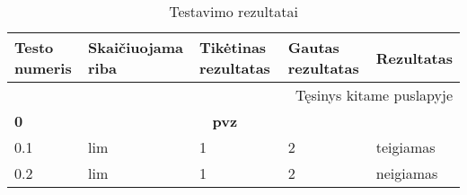 \begin{center}
    \newcommand*\rot{\rotatebox{90}}
    \newcommand{\x}{$\times$}
    \newcommand{\green}{\cellcolor{green!50} teigiamas}
    \newcommand{\red}{\cellcolor{red!50} neigiamas}
    \newcommand{\noLimit}{Riba neegzistuoja}
    \newcommand{\header}[2]{\textbf{#1} & \multicolumn{3}{c}{\textbf{#2}} & \\ \hline}
    \begin{longtable}{|m{}|m{}|m{}|m{}|m{}|}
    \caption{Testavimo rezultatai} \label{tab:rez} \\
    \hline
        \textbf{Testo numeris} & \textbf{Skaičiuojama riba} &\textbf{Tikėtinas rezultatas} & \textbf{Gautas rezultatas} & \textbf{Rezultatas} \\ \hline
    \endhead
        \multicolumn{5}{|r|}{{Tęsinys kitame puslapyje}} \\ \hline
    \endfoot
    \hline \hline
    \endlastfoot
    \header{0}{pvz}
    0.1 & lim & 1 & 2  & \green \\ \hline
    0.2 & lim & 1 & 2  & \red \\ \hline


\end{longtable}
\end{center}
